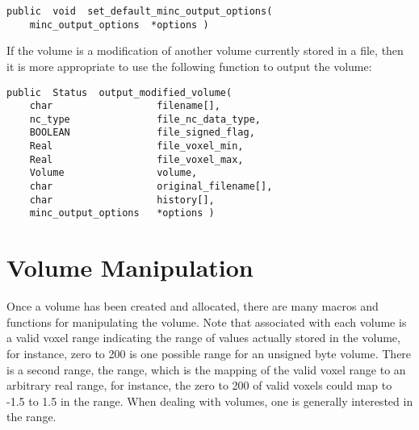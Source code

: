 {\bf\begin{verbatim}
public  void  set_default_minc_output_options(
    minc_output_options  *options )
\end{verbatim}}


If the volume is a modification of another volume currently stored in
a file, then it is more appropriate to use the following function to
output the volume:

{\bf\begin{verbatim}
public  Status  output_modified_volume(
    char                  filename[],
    nc_type               file_nc_data_type,
    BOOLEAN               file_signed_flag,
    Real                  file_voxel_min,
    Real                  file_voxel_max,
    Volume                volume,
    char                  original_filename[],
    char                  history[],
    minc_output_options   *options )
\end{verbatim}}


\section{Volume Manipulation}

Once a volume has been created and allocated, there are many macros
and functions for manipulating the volume.  Note that associated with
each volume is a valid voxel range indicating the range of values
actually stored in the volume, for instance, zero to 200 is one
possible range for an unsigned byte volume.  There is a second range,
the  range, which is the mapping of the valid voxel range
to an arbitrary real range, for instance, the zero to 200 of valid
voxels could map to -1.5 to 1.5 in the  range.  When
dealing with volumes, one is generally interested in the 
range.

